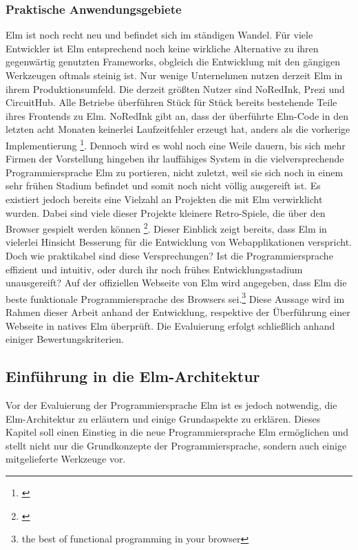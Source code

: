 \subsubsection{Praktische Anwendungsgebiete}
\label{sec:Praktische Anwendungsgebiete}
Elm ist noch recht neu und befindet sich im ständigen Wandel. Für viele Entwickler ist Elm entsprechend noch keine wirkliche Alternative zu ihren gegenwärtig genutzten Frameworks, obgleich die Entwicklung mit den gängigen Werkzeugen oftmals steinig ist. Nur wenige Unternehmen nutzen derzeit Elm in ihrem Produktionsumfeld. Die derzeit größten Nutzer sind NoRedInk, Prezi und CircuitHub. Alle Betriebe überführen Stück für Stück bereits bestehende Teile ihres Frontends zu Elm. NoRedInk gibt an, dass der überführte Elm-Code in den letzten acht Monaten keinerlei Laufzeitfehler erzeugt hat, anders als die vorherige Implementierung \footnote{\cite[Vgl.]{feldman-no-errors}}.
Dennoch wird es wohl noch eine Weile dauern, bis sich mehr Firmen der Vorstellung hingeben ihr lauffähiges System in die vielversprechende Programmiersprache Elm zu portieren, nicht zuletzt, weil sie sich noch in einem sehr frühen Stadium befindet und somit noch nicht völlig ausgereift ist.
Es existiert jedoch bereits eine Vielzahl an Projekten die mit Elm verwirklicht wurden. Dabei sind viele dieser Projekte kleinere Retro-Spiele, die über den Browser gespielt werden können \footnote{\cite[vgl.]{builtwithelm}}.
Dieser Einblick zeigt bereits, dass Elm in vielerlei Hinsicht Besserung für die Entwicklung von Webapplikationen verspricht. Doch wie praktikabel sind diese Versprechungen? Ist die Programmiersprache effizient und intuitiv, oder durch ihr noch frühes Entwicklungsstadium unausgereift?
Auf der offiziellen Webseite von Elm wird angegeben, dass Elm die beste funktionale Programmiersprache des Browsers sei.\footnote{\glqq the best of functional programming in your browser\grqq\cite[Vgl.]{elm-no-runtime-errors}}
Diese Aussage wird im Rahmen dieser Arbeit anhand der Entwicklung, respektive der Überführung einer Webseite in natives Elm überprüft. Die Evaluierung erfolgt schließlich anhand einiger Bewertungskriterien.

\subsection{Einführung in die Elm-Architektur}
\label{sec:elm-architektur}
Vor der Evaluierung der Programmiersprache Elm ist es jedoch notwendig, die Elm-Architektur zu erläutern und einige Grundaspekte zu erklären. Dieses Kapitel soll einen Einstieg in die neue Programmiersprache Elm ermöglichen und stellt nicht nur die Grundkonzepte der Programmiersprache, sondern auch einige mitgelieferte Werkzeuge vor.

